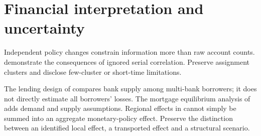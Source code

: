 \section{Financial interpretation and uncertainty}
Independent policy changes constrain information more than raw account
counts. \citet{bertrand2004} demonstrate the consequences of ignored
serial correlation. Preserve assignment clusters and disclose few-cluster
or short-time limitations.

The lending design of \citet{mian2006} compares bank supply among
multi-bank borrowers; it does not directly estimate all borrowers' losses.
The mortgage equilibrium analysis of \citet{benetton2021} adds demand
and supply assumptions. Regional effects in \citet{beraja2019} cannot
simply be summed into an aggregate monetary-policy effect. Preserve the
distinction between an identified local effect, a transported effect and
a structural scenario.
